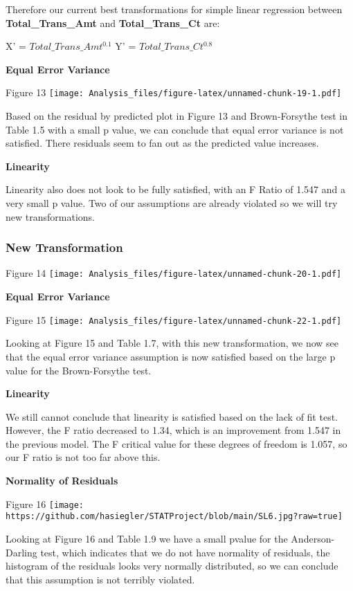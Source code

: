 \documentclass[
]{article}
\begin{document}
Therefore our current best transformations for simple linear regression
between \textbf{Total\_Trans\_Amt} and \textbf{Total\_Trans\_Ct} are:

X' = \(Total\_Trans\_Amt^{0.1}\) Y' = \(Total\_Trans\_Ct^{0.8}\)

\textbf{Equal Error Variance}

Figure 13
\texttt{[image: Analysis\_files/figure-latex/unnamed-chunk-19-1.pdf]}

Based on the residual by predicted plot in Figure 13 and Brown-Forsythe
test in Table 1.5 with a small p value, we can conclude that equal error
variance is not satisfied. There residuals seem to fan out as the
predicted value increases.

\textbf{Linearity}

Linearity also does not look to be fully satisfied, with an F Ratio of
1.547 and a very small p value. Two of our assumptions are already
violated so we will try new transformations.

\hypertarget{new-transformation}{%
\subsubsection{New Transformation}\label{new-transformation}}

Figure 14
\texttt{[image: Analysis\_files/figure-latex/unnamed-chunk-20-1.pdf]}

\textbf{Equal Error Variance}

Figure 15
\texttt{[image: Analysis\_files/figure-latex/unnamed-chunk-22-1.pdf]}

Looking at Figure 15 and Table 1.7, with this new transformation, we now
see that the equal error variance assumption is now satisfied based on
the large p value for the Brown-Forsythe test.

\textbf{Linearity}

We still cannot conclude that linearity is satisfied based on the lack
of fit test. However, the F ratio decreased to 1.34, which is an
improvement from 1.547 in the previous model. The F critical value for
these degrees of freedom is 1.057, so our F ratio is not too far above
this.

\textbf{Normality of Residuals}

Figure 16
\texttt{[image: https://github.com/hasiegler/STATProject/blob/main/SL6.jpg?raw=true]}

Looking at Figure 16 and Table 1.9 we have a small pvalue for the
Anderson-Darling test, which indicates that we do not have normality of
residuals, the histogram of the residuals looks very normally
distributed, so we can conclude that this assumption is not terribly
violated.
\end{document}
